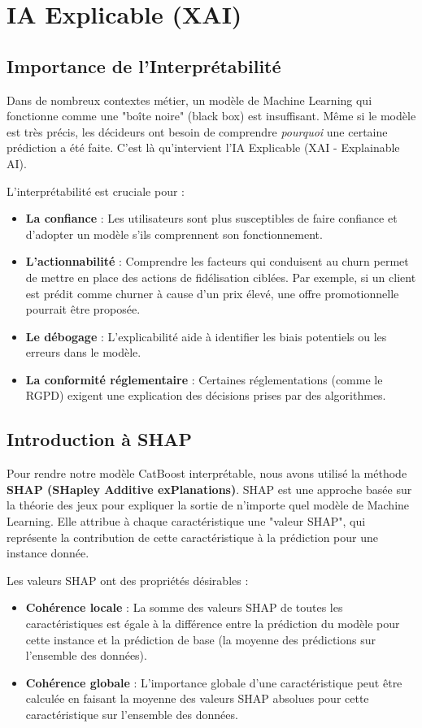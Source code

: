 \chapter{IA Explicable (XAI)}
\minitoc

\section{Importance de l'Interprétabilité}
Dans de nombreux contextes métier, un modèle de Machine Learning qui fonctionne comme une "boîte noire" (black box) est insuffisant. Même si le modèle est très précis, les décideurs ont besoin de comprendre \textit{pourquoi} une certaine prédiction a été faite. C'est là qu'intervient l'IA Explicable (XAI - Explainable AI).

L'interprétabilité est cruciale pour :
\begin{itemize}
    \item \textbf{La confiance} : Les utilisateurs sont plus susceptibles de faire confiance et d'adopter un modèle s'ils comprennent son fonctionnement.
    \item \textbf{L'actionnabilité} : Comprendre les facteurs qui conduisent au churn permet de mettre en place des actions de fidélisation ciblées. Par exemple, si un client est prédit comme churner à cause d'un prix élevé, une offre promotionnelle pourrait être proposée.
    \item \textbf{Le débogage} : L'explicabilité aide à identifier les biais potentiels ou les erreurs dans le modèle.
    \item \textbf{La conformité réglementaire} : Certaines réglementations (comme le RGPD) exigent une explication des décisions prises par des algorithmes.
\end{itemize}

\section{Introduction à SHAP}
Pour rendre notre modèle CatBoost interprétable, nous avons utilisé la méthode \textbf{SHAP (SHapley Additive exPlanations)}. SHAP est une approche basée sur la théorie des jeux pour expliquer la sortie de n'importe quel modèle de Machine Learning. Elle attribue à chaque caractéristique une "valeur SHAP", qui représente la contribution de cette caractéristique à la prédiction pour une instance donnée.

Les valeurs SHAP ont des propriétés désirables :
\begin{itemize}
    \item \textbf{Cohérence locale} : La somme des valeurs SHAP de toutes les caractéristiques est égale à la différence entre la prédiction du modèle pour cette instance et la prédiction de base (la moyenne des prédictions sur l'ensemble des données).
    \item \textbf{Cohérence globale} : L'importance globale d'une caractéristique peut être calculée en faisant la moyenne des valeurs SHAP absolues pour cette caractéristique sur l'ensemble des données.
\end{itemize}

